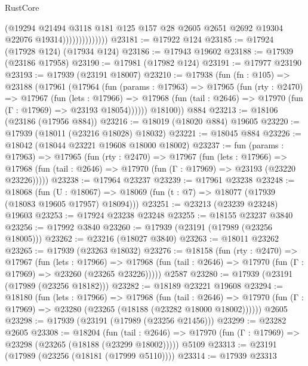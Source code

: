 \begin{lexlean}{RustCore}
\begin{coremodule}
                              (@19294
                                @21494
                                @3118
                                @181
                                @125
                                @157
                                @28
                                @2605
                                @2651
                                @2692
                                @19304
                                @22076
                                @19314))))))))))))))
@23181 := @17922 @124
@23185 := @17924 (@17928 @124) (@17934 @124)
@23186 := @17943 @19602
@23188 := @17939 (@23186 @17958)
@23190 := @17981 (@17982 @124)
@23191 := @17977 @23190
@23193 := @17939 (@23191 @18007)
@23210 := @17938
    (fun (fn : @105) =>
    @23188
      (@17961
        (@17964
          (fun (params : @17963) =>
          @17965
            (fun (rty : @2470) =>
            @17967
              (fun (lets : @17966) =>
              @17968 (fun (tail : @2646) => @17970 (fun (Γ : @17969) => @23193 @18054))))))
        @18100))
    @884
@23213 := @18106 (@23186 (@17956 @884))
@23216 := @18019 (@18020 @884) @19605
@23220 := @17939 (@18011 (@23216 @18028) @18032)
@23221 := @18045 @884
@23226 := @18042 (@18044 @23221 @19608 @18000 @18002)
@23237 := fun (params : @17963) =>
  @17965
    (fun (rty : @2470) =>
    @17967
      (fun (lets : @17966) =>
      @17968 (fun (tail : @2646) => @17970 (fun (Γ : @17969) => @23193 (@23220 @23226)))))
@23238 := @17964 @23237
@23239 := @17961 @23238
@23248 := @18068
    (fun (U : @18067) => @18069 (fun (t : @7) => @18077 (@17939 (@18083 @19605 @17957) @18094)))
@23251 := @23213 (@23239 @23248) @19603
@23253 := @17924 @23238 @23248
@23255 := @18155 @23237 @3840
@23256 := @17992 @3840
@23260 := @17939 (@23191 (@17989 (@23256 @18005)))
@23262 := @23216 (@18027 @3840)
@23263 := @18011 @23262
@23265 := @17939 (@23263 @18032)
@23276 := @18158
    (fun (rty : @2470) =>
    @17967
      (fun (lets : @17966) =>
      @17968 (fun (tail : @2646) => @17970 (fun (Γ : @17969) => @23260 (@23265 @23226)))))
    @2587
@23280 := @17939 (@23191 (@17989 (@23256 @18182)))
@23282 := @18189 @23221 @19608
@23294 := @18180
    (fun (lets : @17966) =>
    @17968
      (fun (tail : @2646) =>
      @17970 (fun (Γ : @17969) => @23280 (@23265 (@18188 (@23282 @18000 @18002))))))
    @2605
@23298 := @17939 (@23191 (@17989 (@23256 @21456)))
@23299 := @23282 @2605
@23308 := @18204
    (fun (tail : @2646) => @17970 (fun (Γ : @17969) => @23298 (@23265 (@18188 (@23299 @18002)))))
    @5109
@23313 := @23191 (@17989 (@23256 (@18181 (@17999 @5110))))
@23314 := @17939 @23313

\end{coremodule}
\end{lexlean}
